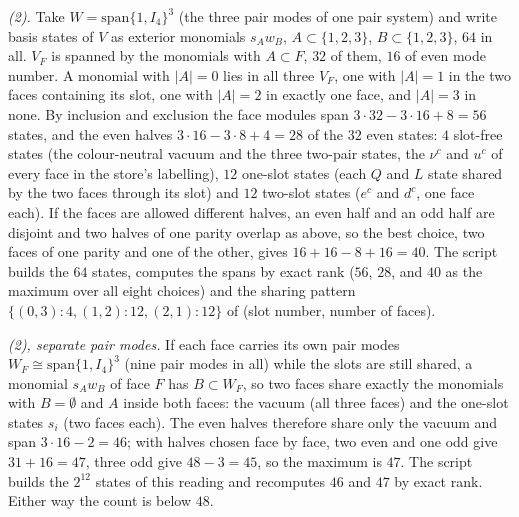 \emph{(2).} Take $W = \mathrm{span}\{1, I_4\}^{3}$ (the three pair modes of one pair system) and write basis states of $V$ as exterior monomials $s_{A}w_{B}$, $A \subset \{1,2,3\}$, $B \subset \{1,2,3\}$, $64$ in all. $V_{F}$ is spanned by the monomials with $A \subset F$, $32$ of them, $16$ of even mode number. A monomial with $|A| = 0$ lies in all three $V_{F}$, one with $|A| = 1$ in the two faces containing its slot, one with $|A| = 2$ in exactly one face, and $|A| = 3$ in none. By inclusion and exclusion the face modules span $3 \cdot 32 - 3 \cdot 16 + 8 = 56$ states, and the even halves $3 \cdot 16 - 3 \cdot 8 + 4 = 28$ of the $32$ even states: $4$ slot-free states (the colour-neutral vacuum and the three two-pair states, the $\nu^{c}$ and $u^{c}$ of every face in the store's labelling), $12$ one-slot states (each $Q$ and $L$ state shared by the two faces through its slot) and $12$ two-slot states ($e^{c}$ and $d^{c}$, one face each). If the faces are allowed different halves, an even half and an odd half are disjoint and two halves of one parity overlap as above, so the best choice, two faces of one parity and one of the other, gives $16 + 16 - 8 + 16 = 40$. The script builds the $64$ states, computes the spans by exact rank ($56$, $28$, and $40$ as the maximum over all eight choices) and the sharing pattern $\{(0, 3): 4, (1, 2): 12, (2, 1): 12\}$ of (slot number, number of faces).

\emph{(2), separate pair modes.} If each face carries its own pair modes $W_{F} \cong \mathrm{span}\{1, I_4\}^{3}$ (nine pair modes in all) while the slots are still shared, a monomial $s_{A}w_{B}$ of face $F$ has $B \subset W_{F}$, so two faces share exactly the monomials with $B = \emptyset$ and $A$ inside both faces: the vacuum (all three faces) and the one-slot states $s_{i}$ (two faces each). The even halves therefore share only the vacuum and span $3 \cdot 16 - 2 = 46$; with halves chosen face by face, two even and one odd give $31 + 16 = 47$, three odd give $48 - 3 = 45$, so the maximum is $47$. The script builds the $2^{12}$ states of this reading and recomputes $46$ and $47$ by exact rank. Either way the count is below $48$.

